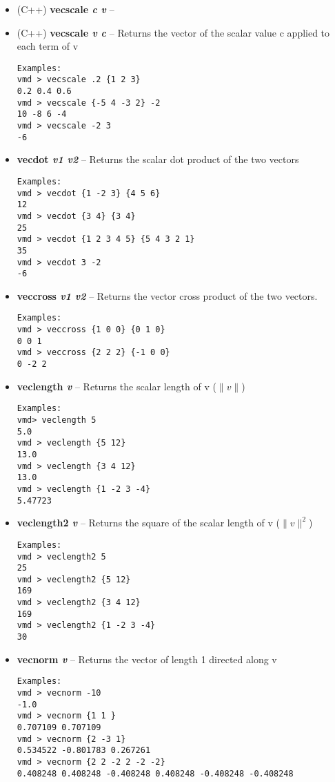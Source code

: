 \begin{itemize}
\item (C++) {\bf vecscale {\it c v}} --
\item (C++) {\bf vecscale {\it v c}} --
Returns the vector of the scalar value c applied to each term of v
\begin{verbatim}
Examples:
vmd > vecscale .2 {1 2 3}
0.2 0.4 0.6
vmd > vecscale {-5 4 -3 2} -2
10 -8 6 -4
vmd > vecscale -2 3
-6
\end{verbatim}

\item {\bf vecdot {\it v1 v2}} --
Returns the scalar dot product of the two vectors
\begin{verbatim}
Examples:
vmd > vecdot {1 -2 3} {4 5 6}
12
vmd > vecdot {3 4} {3 4}
25
vmd > vecdot {1 2 3 4 5} {5 4 3 2 1}
35
vmd > vecdot 3 -2
-6
\end{verbatim}

\item {\bf veccross {\it v1 v2}} --
Returns the vector cross product of the two vectors.
\begin{verbatim}
Examples:
vmd > veccross {1 0 0} {0 1 0}
0 0 1
vmd > veccross {2 2 2} {-1 0 0}
0 -2 2
\end{verbatim}

\item {\bf veclength {\it v}} --
Returns the scalar length of v ($\|v\|$)
\begin{verbatim}
Examples:
vmd> veclength 5
5.0
vmd > veclength {5 12}
13.0
vmd > veclength {3 4 12}
13.0
vmd > veclength {1 -2 3 -4}
5.47723
\end{verbatim}

\item {\bf veclength2 {\it v}} --
Returns the square of the scalar length of v ($\|v\|^2$)
\begin{verbatim}
Examples:
vmd > veclength2 5
25
vmd > veclength2 {5 12}
169
vmd > veclength2 {3 4 12}
169
vmd > veclength2 {1 -2 3 -4}
30
\end{verbatim}

\item {\bf vecnorm {\it v}} --
Returns the vector of length 1 directed along v
\begin{verbatim}
Examples:
vmd > vecnorm -10
-1.0
vmd > vecnorm {1 1 }
0.707109 0.707109
vmd > vecnorm {2 -3 1}
0.534522 -0.801783 0.267261
vmd > vecnorm {2 2 -2 2 -2 -2}
0.408248 0.408248 -0.408248 0.408248 -0.408248 -0.408248
\end{verbatim}


\end{itemize}
